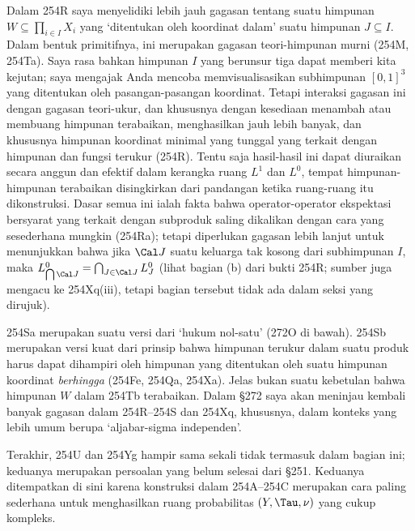 {Dalam 254R saya menyelidiki lebih jauh gagasan tentang suatu himpunan
$W\subseteq\prod_{i\in I}X_i$ yang `ditentukan oleh koordinat dalam' suatu himpunan
$J\subseteq I$. Dalam bentuk primitifnya, ini merupakan gagasan teori-himpunan murni
(254M, 254Ta). Saya rasa bahkan himpunan $I$ yang berunsur tiga dapat
memberi kita kejutan; saya mengajak Anda mencoba memvisualisasikan subhimpunan
$[0,1]^3$ yang ditentukan oleh pasangan-pasangan koordinat. Tetapi
interaksi gagasan ini dengan gagasan teori-ukur, dan khususnya
dengan kesediaan menambah atau membuang himpunan terabaikan, menghasilkan jauh
lebih banyak, dan khususnya himpunan koordinat minimal yang tunggal
yang terkait dengan himpunan dan fungsi terukur (254R). Tentu saja
hasil-hasil ini dapat diuraikan secara anggun dan efektif dalam kerangka
ruang $L^1$ dan $L^0$, tempat himpunan-himpunan terabaikan disingkirkan dari pandangan
ketika ruang-ruang itu dikonstruksi. Dasar semua ini ialah fakta bahwa
operator-operator ekspektasi bersyarat yang terkait dengan subproduk
saling dikalikan dengan cara yang sesederhana mungkin (254Ra); tetapi diperlukan
gagasan lebih lanjut untuk menunjukkan bahwa jika $\Cal J$ suatu keluarga tak kosong dari
subhimpunan $I$, maka $L^0_{\bigcap\Cal J}=\bigcap_{J\in\Cal J}L^0_J$
(lihat bagian (b) dari bukti 254R; sumber juga mengacu ke 254Xq(iii),
tetapi bagian tersebut tidak ada dalam seksi yang dirujuk).

254Sa merupakan suatu versi dari `hukum nol-satu' (272O di bawah). 254Sb merupakan
versi kuat dari prinsip bahwa himpunan terukur dalam suatu
produk harus dapat dihampiri oleh himpunan yang ditentukan oleh suatu himpunan koordinat
{\it berhingga} (254Fe, 254Qa, 254Xa). Jelas bukan suatu kebetulan
bahwa himpunan $W$ dalam 254Tb terabaikan. Dalam \S272 saya akan meninjau kembali banyak
gagasan dalam 254R--254S dan 254Xq, khususnya, dalam konteks yang lebih
umum berupa `aljabar-sigma independen'.

Terakhir, 254U dan 254Yg hampir sama sekali tidak termasuk dalam bagian ini; keduanya merupakan
persoalan yang belum selesai dari \S251. Keduanya ditempatkan di sini karena konstruksi
dalam 254A--254C merupakan cara paling sederhana untuk menghasilkan ruang
probabilitas $(Y,\Tau,\nu)$ yang cukup kompleks.
}%

\discrpage
